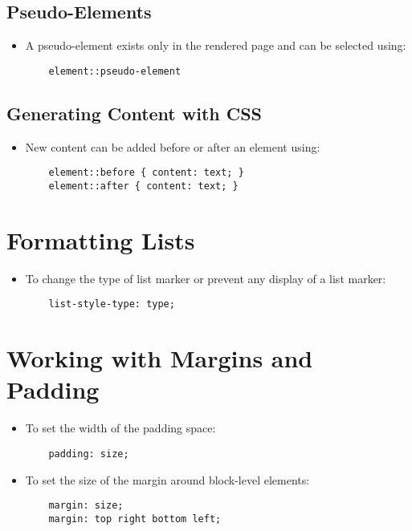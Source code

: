 \documentclass{article}
\begin{document}
\subsection{Pseudo-Elements}
\begin{itemize}
    \item A pseudo-element exists only in the rendered page and can be selected using:
    \begin{lstlisting}
    element::pseudo-element
    \end{lstlisting}
\end{itemize}

\subsection{Generating Content with CSS}
\begin{itemize}
    \item New content can be added before or after an element using:
    \begin{lstlisting}
    element::before { content: text; }
    element::after { content: text; }
    \end{lstlisting}
\end{itemize}

\section{Formatting Lists}
\begin{itemize}
    \item To change the type of list marker or prevent any display of a list marker:
    \begin{lstlisting}
    list-style-type: type;
    \end{lstlisting}
\end{itemize}

\section{Working with Margins and Padding}
\begin{itemize}
    \item To set the width of the padding space:
    \begin{lstlisting}
    padding: size;
    \end{lstlisting}
    \item To set the size of the margin around block-level elements:
    \begin{lstlisting}
    margin: size;
    margin: top right bottom left;
    \end{lstlisting}
\end{itemize}
\end{document}

